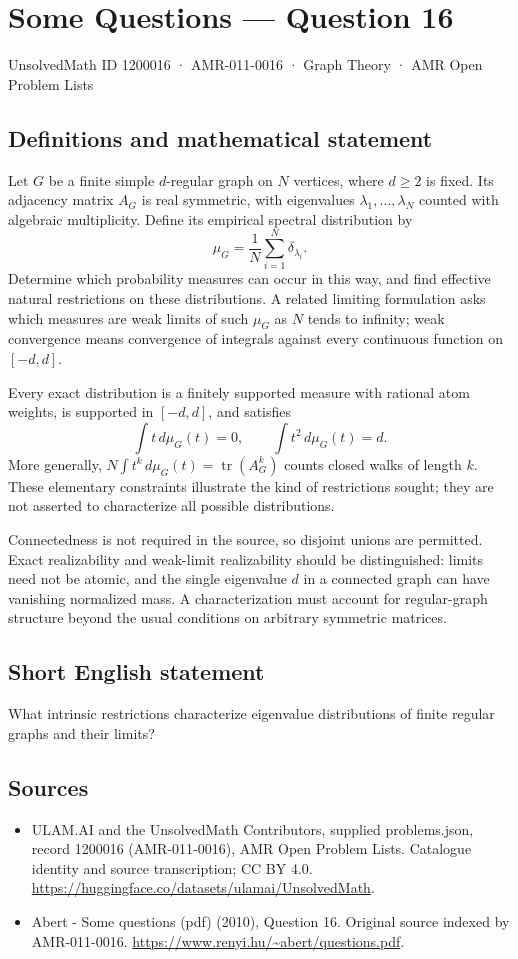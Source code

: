 \documentclass[11pt,a4paper]{article}
\begin{document}
\section*{Some Questions — Question 16}\label{1200016}
{\small UnsolvedMath ID 1200016 · AMR-011-0016 · Graph Theory · AMR Open Problem Lists}
\subsection{Definitions and mathematical statement}
Let $G$ be a finite simple $d$-regular graph on $N$ vertices, where $d\geq2$ is fixed. Its adjacency matrix $A_G$ is real symmetric, with eigenvalues $\lambda_1,\ldots,\lambda_N$ counted with algebraic multiplicity. Define its empirical spectral distribution by
\[
 \mu_G=\frac1N\sum_{i=1}^N\delta_{\lambda_i}.
\]
Determine which probability measures can occur in this way, and find effective natural restrictions on these distributions. A related limiting formulation asks which measures are weak limits of such $\mu_G$ as $N$ tends to infinity; weak convergence means convergence of integrals against every continuous function on $[-d,d]$.

Every exact distribution is a finitely supported measure with rational atom weights, is supported in $[-d,d]$, and satisfies
\[
 \int t\,d\mu_G(t)=0,\qquad \int t^2\,d\mu_G(t)=d.
\]
More generally, $N\int t^k\,d\mu_G(t)=\operatorname{tr}(A_G^k)$ counts closed walks of length $k$. These elementary constraints illustrate the kind of restrictions sought; they are not asserted to characterize all possible distributions.

Connectedness is not required in the source, so disjoint unions are permitted. Exact realizability and weak-limit realizability should be distinguished: limits need not be atomic, and the single eigenvalue $d$ in a connected graph can have vanishing normalized mass. A characterization must account for regular-graph structure beyond the usual conditions on arbitrary symmetric matrices.
\subsection{Short English statement}
What intrinsic restrictions characterize eigenvalue distributions of finite regular graphs and their limits?
\subsection{Sources}
\begin{itemize}
\item[S1] ULAM.AI and the UnsolvedMath Contributors, supplied problems.json, record 1200016 (AMR-011-0016), AMR Open Problem Lists. Catalogue identity and source transcription; CC BY 4.0.
\url{https://huggingface.co/datasets/ulamai/UnsolvedMath}.
\item[S2] Abert - Some questions (pdf) (2010), Question 16. Original source indexed by AMR-011-0016.
\url{https://www.renyi.hu/~abert/questions.pdf}.
\end{itemize}
\end{document}
